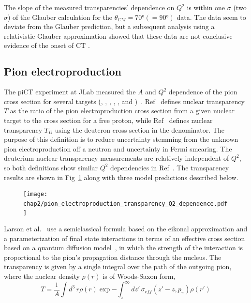 The slope of the measured transparencies' dependence on $Q^2$ is within one
$\sigma$ (two $\sigma$) of the Glauber calculation for the
$\theta_{CM}=\ang{70}(=\ang{90})$ data.
The data seem to deviate from the Glauber prediction, but a subsequent analysis
using a relativistic Glauber approximation showed that these
data are not conclusive evidence of the onset of CT \cite{Cosyn_2006}.


\subsection{Pion electroproduction}
The piCT experiment at JLab measured the $A$ and $Q^2$ dependence of the pion
cross section for several targets (, , ,
, , and )~\cite{Clasie_2007, Qian_2010}.
Ref~\cite{Clasie_2007} defines nuclear transparency $T$ as the ratio of the pion
electroproduction cross section from a given nuclear target to the cross
section for a free proton, while Ref~\cite{Qian_2010} defines nuclear
transparency $T_D$ using the deuteron cross section in the denominator.
The purpose of this definition is to reduce uncertainty stemming from
the unknown pion electroproduction off a neutron and uncertainty in Fermi
smearing.
The deuterium nuclear transparency measurements are relatively independent of
$Q^2$, so both definitions show similar $Q^2$ dependencies in
Ref~\cite{Qian_2010}.
The transparency results are shown in
Fig~\ref{fig:pion_electroproduction_transparency_Q2_dependence} along with three
model predictions described below.

\begin{figure}[!h]
    \centering
    \texttt{[image: chap2/pion\_electroproduction\_transparency\_Q2\_dependence.pdf]}
    \caption{
            }
    \label{fig:pion_electroproduction_transparency_Q2_dependence}
\end{figure}

Larson et al.~\cite{Larson_2006} use a semiclassical formula based on the
eikonal approximation and a parameterization of final state interactions in
terms of an effective cross section based on a quantum diffusion
model~\cite{Farrar_1988}, in which the strength of the interaction is
proportional to the pion's propagation distance through the nucleus.
The transparency is given by a single integral over the path of the outgoing
pion, where the nuclear density $\rho(r)$ is of Woods-Saxon form,
\begin{equation}
    T = \frac{1}{A}\int d^3 \, r \rho(r)
           \exp{
                 -\int_z^\infty dz' \, \sigma_{eff} (z'-z,p_\pi) \rho(r')
               }
\end{equation}


